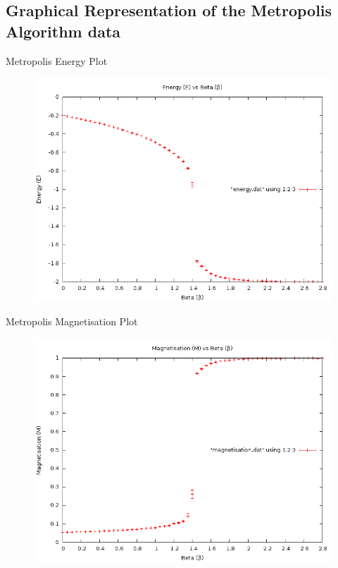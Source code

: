 \documentclass[12pt]{beamer}
\begin{document}
\subsection{Graphical Representation of the Metropolis Algorithm data}

\begin{frame}{Metropolis Energy Plot}
\begin{figure}
\centering
\includegraphics[width=\textwidth]{Q10EnergyBeta16x16RangeofBeta.png}
\end{figure}
\end{frame}

\begin{frame}{Metropolis Magnetisation Plot}
\begin{figure}
\centering
\includegraphics[width=\textwidth]{Q10MagnetisationBeta16x16RangeofBeta.png}
\end{figure}
\end{frame}
\end{document}
